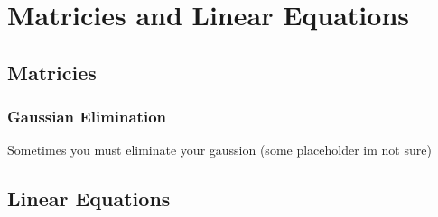 \chapter{Matricies and Linear Equations}   %

\section{Matricies}  %
\subsection{Gaussian Elimination}  %
Sometimes you must eliminate your gaussion (some placeholder im not sure)
\section{Linear Equations}
\lipsum[2]
